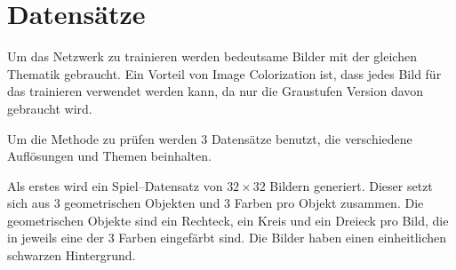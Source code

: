 \section{Datensätze}
Um das Netzwerk zu trainieren werden bedeutsame Bilder mit der gleichen Thematik gebraucht.
Ein Vorteil von Image Colorization ist, dass jedes Bild für das trainieren
verwendet werden kann, da nur die Graustufen Version davon gebraucht wird.

Um die Methode zu prüfen werden 3 Datensätze benutzt, die verschiedene Auflösungen und Themen beinhalten.

Als erstes wird ein Spiel–Datensatz von $ 32 \times 32 $ Bildern generiert. Dieser setzt sich aus 3 geometrischen Objekten und 3 Farben pro
Objekt zusammen. Die geometrischen Objekte sind ein Rechteck, ein Kreis und ein Dreieck pro Bild, die in jeweils eine der 3 Farben eingefärbt sind.
Die Bilder haben einen einheitlichen schwarzen Hintergrund.

